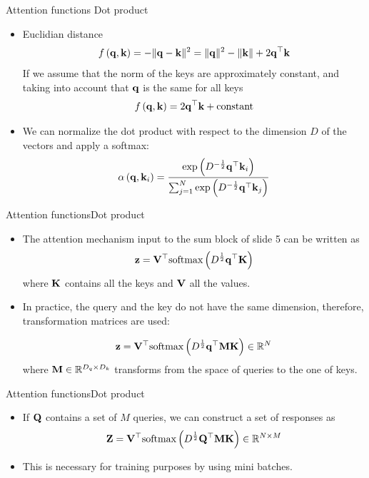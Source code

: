 \documentclass{beamer}
\begin{document}
\begin{frame}{Attention functions}
{Dot product}
\begin{itemize}
\item Euclidian distance
\begin{equation}
    f\left({\bf q},{\bf k} \right) =-\|{\bf q}-{\bf k}\|^2 = \|{\bf q}\|^2 - \|{\bf k}\| +2{\bf q}^\top {\bf k}
\end{equation}
If we assume that the norm of the keys are approximately constant, and taking into account that ${\bf q}$ is the same for all keys 
\begin{equation}
    f\left({\bf q},{\bf k} \right) =2{\bf q}^\top {\bf k} + \text{constant}
\end{equation}
\item We can normalize the dot product with respect to the dimension $D$ of the vectors and apply a softmax:
\begin{equation}
    \alpha\left({\bf q}, {\bf k}_i \right) = \frac{\exp\left(D^{-\frac{1}{2}}{\bf q}^\top {\bf k}_i\right)}{\sum_{j=1}^N \exp\left(D^{-\frac{1}{2}}{\bf q}^\top {\bf k}_j\right)}
\end{equation}

\end{itemize}
    
\end{frame}
\begin{frame}{Attention functions}{Dot product}
\begin{itemize}
\item The attention mechanism input to the sum block of slide 5 can be written as
\begin{equation}
{\bf z} ={\bf V}^\top \text{softmax} \left( D^{\frac{1}{2}} {\bf q}^\top {\bf K} \right) 
\end{equation}
where ${\bf K}$ contains all the keys and ${\bf V}$ all the values.


\item In practice, the query and the key do not have the same dimension, therefore, transformation matrices are used:

\begin{equation}
    {\bf z} ={\bf V}^\top  \text{softmax} \left( D^{\frac{1}{2}} {\bf q}^\top {\bf M} {\bf K} \right) \in \mathbb{R}^N
\end{equation}
where ${\bf M} \in \mathbb{R}^{D_q \times D_k}$ transforms from the space of queries to the one of keys.
 \end{itemize}   
\end{frame}
\begin{frame}{Attention functions}{Dot product}
\begin{itemize}
    \item If ${\bf Q}$ contains a set of $M$ queries, we can construct a set of responses as
\begin{equation}
    {\bf Z} ={\bf V}^\top  \text{softmax} \left( D^{\frac{1}{2}} {\bf Q}^\top {\bf M} {\bf K} \right) \in \mathbb{R}^{N\times M}
\end{equation}
\item This is necessary for training purposes by using mini batches. 
\end{itemize}
\end{frame}
\end{document}

